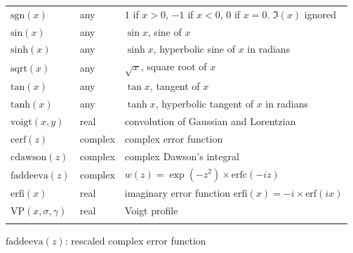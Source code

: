 \documentclass[
  hyper, lang=cn, 
  class=l3dox, 
]{../../zlatex/code/ztex}
\begin{document}
\begin{center}
\begin{longtable}{lll}
    \(\text{sgn}(x)\) & any & $1$ if $x > 0$, $-1$ if $x < 0$, $0$ if $x = 0$. $\Im(x)$ ignored \\
    \(\text{sin}(x)\) & any & $\sin x$, sine of $x$ \\
    \(\text{sinh}(x)\) & any & $\sinh x$, hyperbolic sine of $x$ in radians \\
    \(\text{sqrt}(x)\) & any & $\sqrt{x}$, square root of $x$ \\
    \(\text{tan}(x)\) & any & $\tan x$, tangent of $x$ \\
    \(\text{tanh}(x)\) & any & $\tanh x$, hyperbolic tangent of $x$ in radians \\
    \(\text{voigt}(x,y)\) & real & convolution of Gaussian and Lorentzian \\
    \(\text{cerf}(z)\) & complex & complex error function \\
    \(\text{cdawson}(z)\) & complex & complex Dawson's integral \\
    \(\text{faddeeva}(z)\) & complex & $w(z) = \exp(-z^2) \times \text{erfc}(-iz)$ \\
    \(\text{erfi}(x)\) & real & imaginary error function $\text{erfi}(x) = -i \times \text{erf}(ix)$ \\
    \(\text{VP}(x,\sigma,\gamma)\) & real & Voigt profile \\
    \bottomrule 
    \label{tab:gnuplot-functions}\\
  \end{longtable}
\end{center}
\vspace*{-4em}

\begin{remark}
  \(\text{faddeeva}(z)\): rescaled complex error function
\end{remark}


\clearpage
\end{document}
